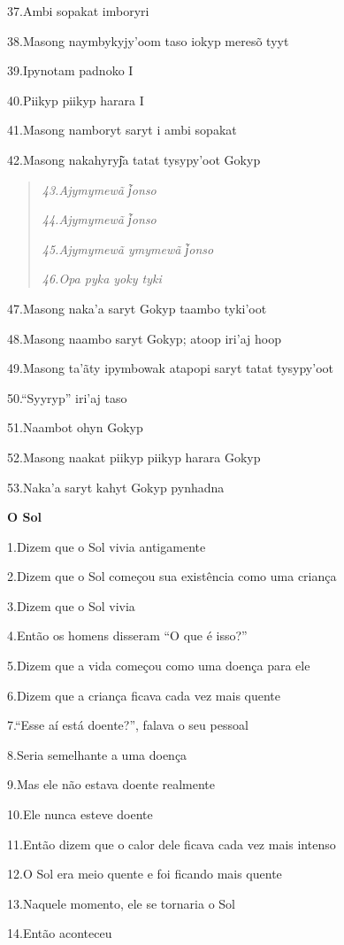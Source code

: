 37.Ambi sopakat imboryri

38.Masong naymbykyjy'oom taso iokyp meresõ tyyt

39.Ipynotam padnoko I

40.Piikyp piikyp harara I

41.Masong namboryt saryt i ambi sopakat

42.Masong nakahyryj͂a tatat tysypy'oot Gokyp

\begin{quote}
\emph{43.Ajymymewã j͂onso}

\emph{44.Ajymymewã j͂onso}

\emph{45.Ajymymewã ymymewã j͂onso}

\emph{46.Opa pyka yoky tyki}
\end{quote}

47.Masong naka'a saryt Gokyp taambo tyki'oot

48.Masong naambo saryt Gokyp; atoop iri'aj hoop

49.Masong ta'ãty ipymbowak atapopi saryt tatat tysypy'oot

50.``Syyryp'' iri'aj taso

51.Naambot ohyn Gokyp

52.Masong naakat piikyp piikyp harara Gokyp

53.Naka'a saryt kahyt Gokyp pynhadna

\textbf{O Sol}

1.Dizem que o Sol vivia antigamente

2.Dizem que o Sol começou sua existência como uma criança

3.Dizem que o Sol vivia

4.Então os homens disseram ``O que é isso?''

5.Dizem que a vida começou como uma doença para ele

6.Dizem que a criança ficava cada vez mais quente

7.``Esse aí está doente?'', falava o seu pessoal

8.Seria semelhante a uma doença

9.Mas ele não estava doente realmente

10.Ele nunca esteve doente

11.Então dizem que o calor dele ficava cada vez mais intenso

12.O Sol era meio quente e foi ficando mais quente

13.Naquele momento, ele se tornaria o Sol

14.Então aconteceu

